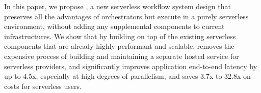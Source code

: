 In this paper, we propose \name{}, a new serverless workflow system design
that preserves all the advantages of orchestrators but execute in a purely
serverless environment, without adding any supplemental components to current
infrastructures. We show that by building on top of the existing serverless
components that are already highly performant and scalable, \name{} removes
the expensive process of building and maintaining a separate hosted service
for serverless providers, and significantly improves application end-to-end
latency by up to 4.5x, especially at high degrees of parallelism, and saves
3.7x to 32.8x on costs for serverless users.






